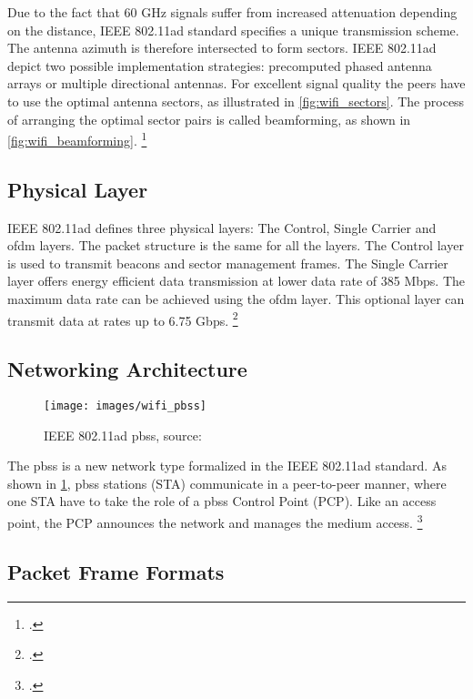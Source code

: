 Due to the fact that 60 GHz signals suffer from increased attenuation depending on the distance, IEEE 802.11ad standard specifies a unique transmission scheme. The antenna azimuth is therefore intersected to form sectors. IEEE 802.11ad depict two possible implementation strategies: precomputed phased antenna arrays or multiple directional antennas. For excellent signal quality the peers have to use the optimal antenna sectors, as illustrated in \cref{fig:wifi_sectors}. The process of arranging the optimal sector pairs is called beamforming, as shown in \cref{fig:wifi_beamforming}. \footcite[Cf.][1-2]{Nitsche2014}

\subsection{Physical Layer}

IEEE 802.11ad defines three physical layers: The Control, Single Carrier and \gls{ofdm} layers. The packet structure is the same for all the layers. The Control layer is used to transmit beacons and sector management frames. The Single Carrier layer offers energy efficient data transmission at lower data rate of 385 Mbps. The maximum data rate can be achieved using the \gls{ofdm} layer. This optional layer can transmit data at rates up to 6.75 Gbps. \footcite[Cf.][3]{Nitsche2014}

\subsection{Networking Architecture}

\begin{figure}[ht]
  \centering
  \texttt{[image: images/wifi\_pbss]}
  \caption{IEEE 802.11ad \gls{pbss}, source: \cite{drcnet}}
  \label{fig:wifi_pbss}
\end{figure}

The \gls{pbss} is a new network type formalized in the IEEE 802.11ad standard. As shown in \cref{fig:wifi_pbss}, \gls{pbss} stations (STA) communicate in a peer-to-peer manner, where one STA have to take the role of a \gls{pbss} Control Point (PCP). Like an access point, the PCP announces the network and manages the medium access. \footcite[Cf.][4]{Nitsche2014}

\subsection{Packet Frame Formats}

